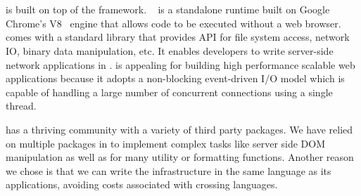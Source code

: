 





\section{\nodejs}

\cb is built on top of the \nodejs framework. \nodejs~\cite{tilkov2010node} is
a standalone \js runtime built on Google Chrome's V8~\cite{v8} \js engine that
allows \js code to be executed without a web browser.  \nodejs comes with a
standard library that provides API for file system access, network IO, binary
data manipulation, etc. It enables developers to write server-side network
applications in \js.  \nodejs is appealing for building high performance
scalable web applications because it adopts a non-blocking event-driven I/O
model which is capable of handling a large number of concurrent connections
using a single thread.

\nodejs has a thriving community with a variety of third party packages.
We have relied on multiple packages in \cb to implement complex tasks like
server side DOM manipulation as well as for many utility or formatting functions. 
Another reason we chose \nodejs is that we can write the \cb infrastructure 
in the same language as its applications, avoiding costs associated with
crossing languages.

